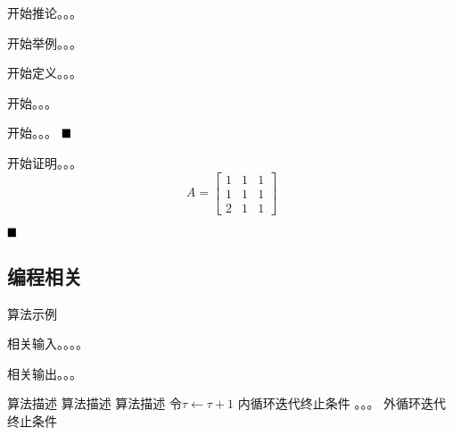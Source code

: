 \begin{corollary}
	\label{corollary1}
	开始推论。。。
\end{corollary}

\begin{example}
	\label{example1}
	开始举例。。。
\end{example}

\begin{definition}
	\label{definition1}
	开始定义。。。
\end{definition}

\begin{remark}
	\label{remark1}
	开始。。。
\end{remark}

\begin{solution}
	\label{solution1}
	开始。。。
	$\hfill\blacksquare$ %
\end{solution}

\begin{proof*} %
	开始证明。。。
	\begin{equation}
		A = \begin{bmatrix}
			1 & 1 & 1 \\
			1 & 1 & 1 \\
			2 & 1 & 1
		\end{bmatrix}
	\end{equation}
	
	$\hfill\blacksquare$ %
\end{proof*}


\subsection{编程相关}

\begin{algorithm}
	\caption{算法示例}
	\label{alg1}
	\begin{algorithmic}[1]
		\REQUIRE 相关输入。。。。
		
		\ENSURE 相关输出。。。
		
		\STATE 算法描述  %
		\STATE 算法描述
		\STATE 算法描述
		\ENDFOR
		\ENDFOR
		\REPEAT
		\REPEAT
		\STATE 令$\tau\gets\tau+1$
		\UNTIL 内循环迭代终止条件
		\STATE 。。。
		\UNTIL 外循环迭代终止条件
	\end{algorithmic}
\end{algorithm}

